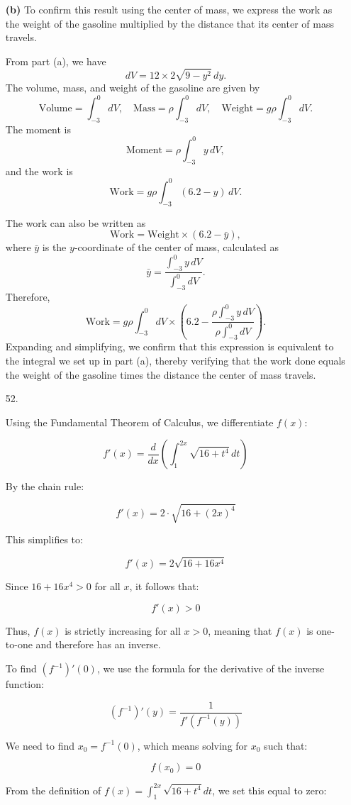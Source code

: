 \documentclass[12pt]{article}
\begin{document}
\begin{enumerate}[start=1,label={\bfseries. },leftmargin=1in]
\textbf{(b)} To confirm this result using the center of mass, we express the work as the weight of the gasoline multiplied by the distance that its center of mass travels.

From part (a), we have
\[
dV = 12 \times 2 \sqrt{9 - y^2} \, dy.
\]
The volume, mass, and weight of the gasoline are given by
\[
\text{Volume} = \int_{-3}^0 dV, \quad \text{Mass} = \rho \int_{-3}^0 dV, \quad \text{Weight} = g \rho \int_{-3}^0 dV.
\]
The moment is
\[
\text{Moment} = \rho \int_{-3}^0 y \, dV,
\]
and the work is
\[
\text{Work} = g \rho \int_{-3}^0 (6.2 - y) \, dV.
\]

The work can also be written as
\[
\text{Work} = \text{Weight} \times (6.2 - \bar{y}),
\]
where \( \bar{y} \) is the \( y \)-coordinate of the center of mass, calculated as
\[
\bar{y} = \frac{\int_{-3}^0 y \, dV}{\int_{-3}^0 dV}.
\]
Therefore,
\[
\text{Work} = g \rho \int_{-3}^0 dV \times \left( 6.2 - \frac{\rho \int_{-3}^0 y \, dV}{\rho \int_{-3}^0 dV} \right).
\]
Expanding and simplifying, we confirm that this expression is equivalent to the integral we set up in part (a), thereby verifying that the work done equals the weight of the gasoline times the distance the center of mass travels.

\item [52. ]

Using the Fundamental Theorem of Calculus, we differentiate $f(x)$:

\[
f'(x) = \frac{d}{dx} \left( \int_1^{2x} \sqrt{16 + t^4} \, dt \right)
\]

By the chain rule:

\[
f'(x) = 2 \cdot \sqrt{16 + (2x)^4}
\]

This simplifies to:

\[
f'(x) = 2 \sqrt{16 + 16x^4}
\]

Since $16 + 16x^4 > 0$ for all $x$, it follows that:

\[
f'(x) > 0
\]

Thus, $f(x)$ is strictly increasing for all $x > 0$, meaning that $f(x)$ is one-to-one and therefore has an inverse.

To find $(f^{-1})'(0)$, we use the formula for the derivative of the inverse function:

\[
(f^{-1})'(y) = \frac{1}{f'(f^{-1}(y))}
\]

We need to find $x_0 = f^{-1}(0)$, which means solving for $x_0$ such that:

\[
f(x_0) = 0
\]

From the definition of $f(x) = \int_1^{2x} \sqrt{16 + t^4} dt$, we set this equal to zero:


\end{enumerate}
\end{document}
